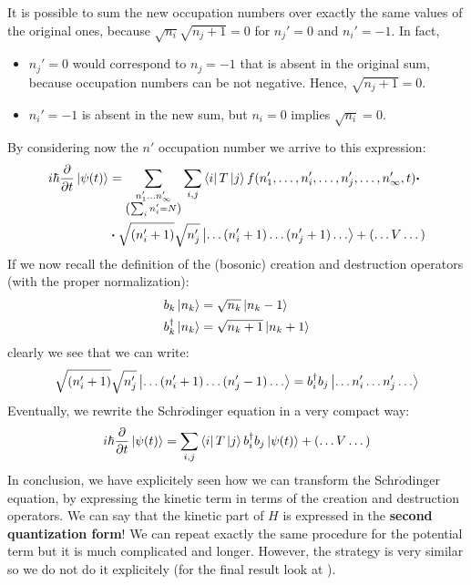 \documentclass[../main/main.tex]{subfiles}
\begin{document}
\begin{remark}
It is possible to sum the new occupation numbers over exactly the same values of the original ones, because \( \sqrt{n_i} \sqrt{n_j +1} = 0   \) for \( n_j'=0 \) and \( n_i' = -1 \).
In fact,
\begin{itemize}
\item \( n_j'=0 \) would correspond to \( n_j = -1 \) that is absent in the original sum, because occupation numbers can be not negative. Hence, \( \sqrt{n_j+1}=0  \).
\item \( n_i'=-1 \) is absent in the new sum, but \( n_i = 0 \)  implies \( \sqrt{n_i}=0  \).
\end{itemize}
\end{remark}
By considering now the \( n' \) occupation number we arrive to this expression:
\begin{equation}
\begin{split}
  i \hbar \pdv{}{t} \ket{\psi (t)} &= \sum_{\substack{n_1' \dots n_ \infty ' \\ \qty(\sum_{i}^{}n_i' = N  )  } }^{} \sum_{i,j}^{}
  \bra{i} T \ket{j} f(n_1', \dots, n_i', \dots, n_j', \dots, n_ \infty',t)  \vdot \\
  & \vdot \sqrt{\qty(n_i'+1) } \sqrt{n_j'} \ket{ \dots (n_i'+1) \dots (n_j' +1) \dots}  + \qty(\dots V \dots)
\end{split}
\end{equation}
If we now recall the definition of the (bosonic) creation and destruction  operators (with the proper normalization):
\begin{subequations}
\begin{align*}
   b_k \ket{n_k} &=  \sqrt{n_k} \ket{n_k -1} \\
   b_k^\dag \ket{n_k} &= \sqrt{n_k+1} \ket{n_k+1}
\end{align*}
\end{subequations}
clearly we see that we can write:
\begin{equation*}
  \sqrt{(n_i'+1)} \sqrt{n_j'} \ket{\dots (n_i'+1) \dots (n_j' -1) \dots} = b_i^\dag b_j \ket{\dots n_i ' \dots n_j' \dots}
\end{equation*}
Eventually, we rewrite the Schr$\ddot{o}$dinger equation in a very compact way:  
\begin{equation}
  i \hbar \pdv{}{t} \ket{\psi (t)} = \sum_{i,j}^{} \bra{i} T \ket{j} b_i^\dag b_j \ket{\psi (t)} + \qty(\dots V \dots)
\end{equation}
In conclusion, we have explicitely seen how we can transform the Schr$\ddot{o}$dinger equation, by expressing the kinetic term in terms of the creation and destruction operators. We can say that the kinetic part of \( H \) is expressed in the \textbf{second quantization form}!
We can repeat exactly the same procedure for the potential term but it is much complicated and longer. However, the strategy is very similar so we do not do it explicitely (for the final result look at \cite{fetter}).
\end{document}
